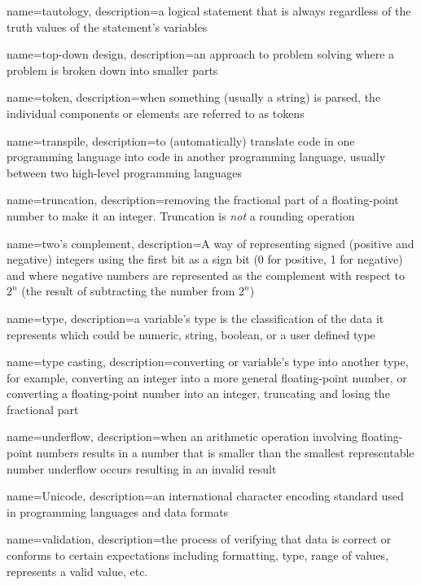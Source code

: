 {
  name=tautology,
  description={a logical statement that is always \True regardless of the truth values of the statement's variables}
}

{
  name=top-down design,
  description={an approach to problem solving where a problem is broken down into smaller parts}
}

{
  name=token,
  description={when something (usually a string) is parsed, the individual components or elements are referred to as tokens}
}

{
  name=transpile,
  description={to (automatically) translate code in one programming language into code in another programming language, usually between two high-level programming languages}
}

{
  name=truncation,
  description={removing the fractional part of a floating-point number to make it an integer.  Truncation is \emph{not} a 
  	rounding operation}
}

{
  name=two's complement,
  description={A way of representing signed (positive and negative) integers using the first bit as a sign bit (0 for positive, 1 for negative) and where negative numbers are represented as the complement with respect to $2^n$ (the result of subtracting the number from $2^n$) }
}

{
  name=type,
  description={a variable's type is the classification of the data it represents which could be numeric, string, boolean, or
  	a user defined type}
}

{
  name=type casting,
  description={converting or variable's type into another type, for example, converting an integer into a more general floating-point number, or
  	converting a floating-point number into an integer, truncating and losing the fractional part}
}

{
  name=underflow,
  description={when an arithmetic operation involving floating-point numbers results in a number that is smaller than the smallest representable
  number underflow occurs resulting in an invalid result}
}

{
  name=Unicode,
  description={an international character encoding standard used in programming languages and data formats}
}

{
  name=validation,
  description={the process of verifying that data is correct or conforms to certain expectations including formatting, type, range of values,
  	represents a valid value, etc.}
}

